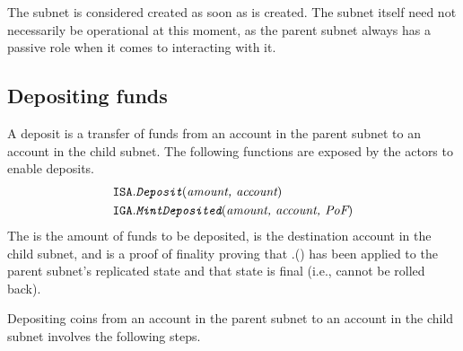The subnet is considered created as soon as  is created.
The subnet itself need not necessarily be operational at this moment,
as the parent subnet always has a passive role when it comes to interacting with it.

\subsection{Depositing funds}
\label{sec:deposit}

A deposit is a transfer of funds from an account in the parent subnet to an account in the child subnet.
The following functions are exposed by the \ipc actors to enable deposits.
\begin{align*}
    \texttt{ISA}.&\textit{\texttt{Deposit}}(\textit{amount, account})\\
    \texttt{IGA}.&\textit{\texttt{MintDeposited}}(\textit{amount, account, \textit{PoF}})
\end{align*}
The  is the amount of funds to be deposited,  is the destination account in the child subnet, and \funcParam{\pof} is a proof of finality proving that \sa.() has been applied to the parent subnet's replicated state and that state is final (i.e., cannot be rolled back).

Depositing  coins from an account  in the parent subnet  to an account  in the child subnet 
involves the following steps.

